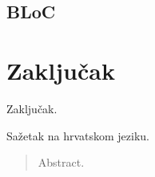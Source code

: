 \documentclass[times, utf8, zavrsni]{fer}
\begin{document}
\section{BLoC}

\chapter{Zaključak}
Zaključak.




\begin{sazetak}
      Sažetak na hrvatskom jeziku.

\end{sazetak}

\begin{abstract}
      Abstract.

\end{abstract}
\end{document}
